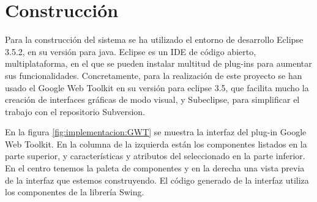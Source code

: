 
\label{chap:implementacion}

\chaptertoc



\section{Construcción}
\label{sec:implementacion:construccion}

Para la construcción del sistema se ha utilizado el entorno de desarrollo Eclipse 3.5.2, en su versión para java.
Eclipse es un IDE de código abierto, multiplataforma, en el que se pueden instalar multitud de plug-ins para aumentar sus funcionalidades. Concretamente, para la realización de este proyecto se han usado el Google Web Toolkit en su versión para eclipse 3.5, que facilita mucho la creación de interfaces gráficas de modo visual, y Subeclipse, para simplificar el trabajo con el repositorio Subversion.
\newline

En la figura \ref{fig:implementacion:GWT} se muestra la interfaz del plug-in Google Web Toolkit. En la columna de la izquierda están los componentes listados en la parte superior, y características y atributos del seleccionado en la parte inferior. En el centro tenemos la paleta de componentes y en la derecha una vista previa de la interfaz que estemos construyendo. El código generado de la interfaz utiliza los componentes de la librería Swing.


